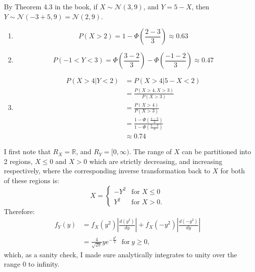 \begin{problem}{9} By Theorem 4.3 in the book, if $X \sim \mathcal N(3, 9)$, and $Y =5-X$, then $Y \sim \mathcal N(-3+5, 9)=\mathcal N(2, 9)$.

\begin{enumerate}
\item 

\begin{equation*}
P(X>2) = 1-\Phi \left(\frac{2-3}{3} \right) \approx 0.63
\end{equation*}

\item

\begin{equation*}
P(-1<Y<3) = \Phi \left(\frac{3-2}{3} \right) -\Phi \left(\frac{-1-2}{3} \right)  \approx 0.47
\end{equation*}

\item

\begin{align*}
P(X>4|Y<2) &=P(X>4|5-X<2) \\
&=\frac{P(X>4, X>3)}{P(X>3)} \\
& = \frac{P(X>4)}{P(X>3)} \\
& = \frac{1-\Phi \left(\frac{4-3}{3} \right)}{1-\Phi \left(\frac{3-3}{3} \right)} \\
& \approx 0.74
\end{align*}


\end{enumerate}

\end{problem}



\begin{problem}{10}  I first note that $R_X = \mathbb R$, and $R_Y=[0, \infty)$.  The range of $X$ can be partitioned into 2 regions, $X \le 0$ and $X>0$ which are strictly decreasing, and increasing respectively, where the corresponding inverse transformation back to $X$ for both of these regions is:
\[
X=
  \begin{cases}
                                   -Y^2 & \text{for $X \le 0$} \\
                                   Y^2 & \text{for $X>0$}.
  \end{cases}
\]
Therefore:
\begin{align*}
f_Y(y) &=f_X(y^2)\left|\frac{d(y^2)}{dy}\right|+f_X(-y^2) \left |\frac{d(-y^2)}{dy}\right |\\
& =\frac{4}{\sqrt{2 \pi}}y e^{-\frac{y^4}{2}} ~~~ \mathrm{for}~ y \ge 0,
\end{align*}
which, as a sanity check, I made sure analytically integrates to unity over the range 0 to infinity.



\end{problem}



